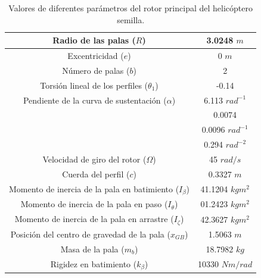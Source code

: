 \begin{table}[]
	\centering
	\begin{tabular}{|>{\columncolor{Gray}}c|c|}
		\hline
		Radio de las palas ($R$) & 3.0248 $m$ \\ \hline
		Excentricidad ($e$) & 0 $m$ \\ \hline
		Número de palas ($b$) & 2 \\ \hline
		Torsión lineal de los perfiles ($\theta_1$) & -0.14 \\ \hline
		Pendiente de la curva de sustentación ($\alpha$) & 6.113 $rad^{-1}$ \\ \hline
		\cellcolor{Gray} & 0.0074 \\ \cline{2-2} 
		\cellcolor{Gray} & 0.0096 $rad^{-1}$ \\ \cline{2-2} 
		\multirow{-3}{*}{\cellcolor{Gray}Parámetros de la polar ($\delta_0$, $\delta_1$, $\delta_2$)} & 0.294 $rad^{-2}$ \\ \hline
		Velocidad de giro del rotor ($\Omega$) & 45 $rad/s$ \\ \hline
		Cuerda del perfil ($c$) & 0.3327 $m$ \\ \hline
		Momento de inercia de la pala en batimiento ($I_\beta$) & 41.1204 $kgm^2$ \\ \hline
		Momento de inercia de la pala en paso ($I_\theta$) & 01.2423 $kgm^2$ \\ \hline
		Momento de inercia de la pala en arrastre ($I_\zeta$) & 42.3627 $kgm^2$ \\ \hline
		Posición del centro de gravedad de la pala ($x_{GB}$) & 1.5063 $m$ \\ \hline
		Masa de la pala ($m_b$) & 18.7982 $kg$ \\ \hline
		Rigidez en batimiento ($k_\beta$) & 10330 $Nm/rad$ \\ \hline
	\end{tabular}
	\caption{Valores de diferentes parámetros del rotor principal del helicóptero semilla.}
	\label{RPHS}
\end{table}

